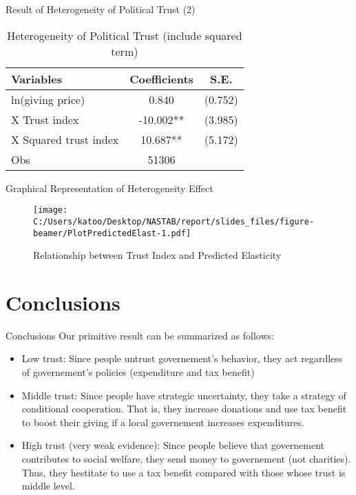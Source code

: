 \documentclass[
  ignorenonframetext,
]{beamer}
\providecommand{\tightlist}{%
  \setlength{\itemsep}{0pt}\setlength{\parskip}{0pt}}
\begin{document}
\begin{frame}{Result of Heterogeneity of Political Trust (2)}
\protect\hypertarget{result-of-heterogeneity-of-political-trust-2}{}
\begin{table}

\caption{\label{tab:kableTabTrustHetero2Reg}Heterogeneity of Political Trust (include squared term)}
\centering
\begin{tabular}[t]{lcc}
\toprule
Variables & Coefficients & S.E.\\
\midrule
ln(giving price) & 0.840 & (0.752)\\
\hspace{1em}X Trust index & -10.002** & (3.985)\\
\hspace{1em}X Squared trust index & 10.687** & (5.172)\\
Obs & 51306 & \\
\bottomrule
\end{tabular}
\end{table}
\end{frame}

\begin{frame}{Graphical Representation of Heterogeneity Effect}
\protect\hypertarget{graphical-representation-of-heterogeneity-effect}{}
\begin{figure}
\centering
\texttt{[image: C:/Users/katoo/Desktop/NASTAB/report/slides\_files/figure-beamer/PlotPredictedElast-1.pdf]}
\caption{Relationship between Trust Index and Predicted Elasticity}
\end{figure}
\end{frame}

\hypertarget{conclusions}{%
\section{Conclusions}\label{conclusions}}

\begin{frame}{Conclusions}
\protect\hypertarget{conclusions-1}{}
Our primitive result can be summarized as follows:

\begin{itemize}
\tightlist
\item
  Low trust: Since people untrust governement's behavior, they act
  regardless of governement's policies (expenditure and tax benefit)
\item
  Middle trust: Since people have strategic uncertainty, they take a
  strategy of conditional cooperation. That is, they increase donations
  and use tax benefit to boost their giving if a local governement
  increases expenditures.
\item
  High trust (very weak evidence): Since people believe that governement
  contributes to social welfare, they send money to governement (not
  charities). Thus, they hestitate to use a tax benefit compared with
  those whose trust is middle level.
\end{itemize}
\end{frame}
\end{document}
